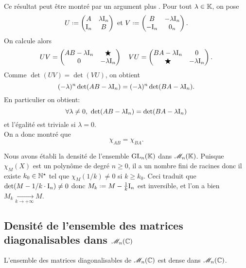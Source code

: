 Ce résultat peut être montré par un argument plus . Pour tout $\lambda \in \mathbb{K}$, on pose
$$
U \defeq
\begin{pmatrix}
    A & \lambda \I_n \\
    \I_n & B
\end{pmatrix}
\text{ et }
V \defeq 
\begin{pmatrix}
    B & -\lambda \I_n \\
    -\I_n & 0_n
\end{pmatrix}.
$$
On calcule alors
$$UV = 
\begin{pmatrix}
    AB - \lambda \mathrm{I}_n & \bigstar \\
    0 & -\lambda \mathrm{I}_n
\end{pmatrix}
\quad
VU = 
\begin{pmatrix}
    BA - \lambda \mathrm{I}_n & 0 \\
    \bigstar & -\lambda \mathrm{I}_n
\end{pmatrix}.
$$
Comme $\det(UV) = \det(VU)$, on obtient
$$(-\lambda)^n \det(AB - \lambda \mathrm{I}_n) = (-\lambda)^n \det(BA - \lambda \mathrm{I}_n).$$
En particulier on obtient:
$$\forall \lambda \not= 0,\ \det(AB - \lambda \mathrm{I}_n) = \det(BA - \lambda \mathrm{I}_n)$$
et l'égalité est triviale si $\lambda = 0$. \\
On a donc montré que 
$$\chi_{A B} = \chi_{B A}.$$

\begin{remarque}
    Nous avons établi la densité de l'ensemble $\mathrm{GL}_n(\mathbb{K})$ dans $\mathscr{M}_n(\mathbb{K})$. Puisque $\chi_M(X)$ est un polynôme de degré $n \geqslant 0$, il a un nombre fini de racines donc il existe $k_0 \in \mathbb{N}^\star$ tel que $\chi_M(1/k) \not= 0$ si $k \geqslant k_0$. Ceci traduit que $\det(M - 1/k \cdot \mathrm{I}_n) \not= 0$ donc $M_k \defeq M - \frac{1}{k} \I_n$ est inversible, et l'on a bien $M_k \xrightarrow[k \to + \infty]{} M$.
\end{remarque}

\subsection{Densité de l'ensemble des matrices diagonalisables dans \texorpdfstring{$\mathscr{M}_n(\mathbb{C})$}{M_n(C)}}

\begin{theo}{}
    L'ensemble des matrices diagonalisables de $\mathscr{M}_n(\mathbb{C})$ est dense dans $\mathscr{M}_n(\mathbb{C})$.
\end{theo}

